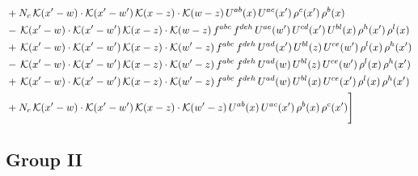 \documentclass[9pt]{article}
\numberwithin{equation}{section}
\begin{document}
\begin{align}
& +N_{c}\,\mathcal{K}(x'-w)\cdot\mathcal{K}(x'-w')\,\mathcal{K}(x-z)\cdot\mathcal{K}(w-z)\,U^{ab}(x)\,U^{ac}(x')\,\rho^{c}(x')\,\rho^{b}(x)\notag\\
& -\,\mathcal{K}(x'-w)\cdot\mathcal{K}(x'-w')\,\mathcal{K}(x-z)\cdot\mathcal{K}(w-z)\,f^{abc}\,f^{deh}\,U^{ae}(w')\,U^{cd}(x')\,U^{bl}(x)\,\rho^{h}(x')\,\rho^{l}(x)\notag\\
& +\,\mathcal{K}(x'-w)\cdot\mathcal{K}(x'-w')\,\mathcal{K}(x-z)\cdot\mathcal{K}(w'-z)\,f^{abc}\,f^{deh}\,U^{ad}(x')\,U^{bl}(z)\,U^{ce}(w')\,\rho^{l}(x)\,\rho^{h}(x')\notag\\
& -\,\mathcal{K}(x'-w)\cdot\mathcal{K}(x'-w')\,\mathcal{K}(x-z)\cdot\mathcal{K}(w'-z)\,f^{abc}\,f^{deh}\,U^{ad}(w)\,U^{bl}(z)\,U^{ce}(w')\,\rho^{l}(x)\,\rho^{h}(x')\notag\\
& +\,\mathcal{K}(x'-w)\cdot\mathcal{K}(x'-w')\,\mathcal{K}(x-z)\cdot\mathcal{K}(w'-z)\,f^{abc}\,f^{deh}\,U^{ad}(w)\,U^{bl}(x)\,U^{ce}(x')\,\rho^{l}(x)\,\rho^{h}(x')\notag\\
& +N_{c}\,\mathcal{K}(x'-w)\cdot\mathcal{K}(x'-w')\,\mathcal{K}(x-z)\cdot\mathcal{K}(w'-z)\,U^{ab}(x)\,U^{ac}(x')\,\rho^{b}(x)\,\rho^{c}(x')\Bigg]
\end{align}
\subsection{Group II}
\end{document}
